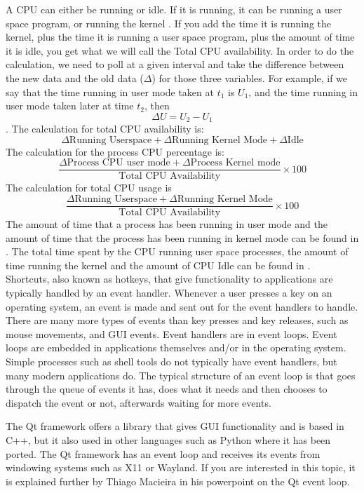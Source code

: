 \documentclass[12pt]{article}
\begin{document}
A CPU can either be running or idle.
If it is running, it can be running a user space program, or running the kernel \cite{scoutBlog}.
If you add the time it is running the kernel, plus the time it is running a user space program, plus the amount of time it is idle, you get what we will call the Total CPU availability.
In order to do the calculation, we need to poll at a given interval and take the difference between the new data and the old data ($\Delta$) for those three variables. For example, if we say that the time running in user mode taken at $t_{1}$ is $U_{1}$, and the time running in user mode taken later at time $t_{2}$, then $$\Delta U = U_{2} - U_{1}$$. The calculation for total CPU availability is:\\
$$ \Delta\text{Running Userspace} + \Delta\text{Running Kernel Mode} + \Delta\text{Idle}$$
The calculation for the process CPU percentage is:\\
$$ \frac{\Delta\text{Process CPU user mode} + \Delta\text{Process Kernel mode}}{\text{Total CPU Availability}} \times 100 $$
The calculation for total CPU usage is\\
$$ \frac{\Delta\text{Running Userspace} + \Delta\text{Running Kernel Mode}}{\text{Total CPU Availability}} \times 100 $$
The amount of time that a process has been running in user mode and the amount of time that the process has been running in kernel mode can be found in . \cite{manProc}
The total time spent by the CPU running user space processes, the amount of time running the kernel and the amount of CPU Idle can be found in  \cite{manProc}.\\
	
	
Shortcuts, also known as hotkeys, that give functionality to applications are typically handled by an event handler.
Whenever a user presses a key on an operating system, an event is made and sent out for the event handlers to handle.
There are many more types of events than key presses and key releases, such as mouse movements, and GUI events.
Event handlers are in event loops. Event loops are embedded in applications themselves and/or in the operating system. Simple processes such as shell tools do not typically have event handlers, but many modern applications do. The typical structure of an event loop is that goes through the queue of events it has, does what it needs and then chooses to dispatch the event or not, afterwards waiting for more events. 

The Qt framework offers a library that gives GUI functionality and is based in C++, but it also used in other languages such as Python where it has been ported.
The Qt framework has an event loop and receives its events from windowing systems such as X11 or Wayland.
If you are interested in this topic, it is explained further by Thiago Macieira in his powerpoint on the Qt event loop\cite{QtSlides}.
\end{document}

